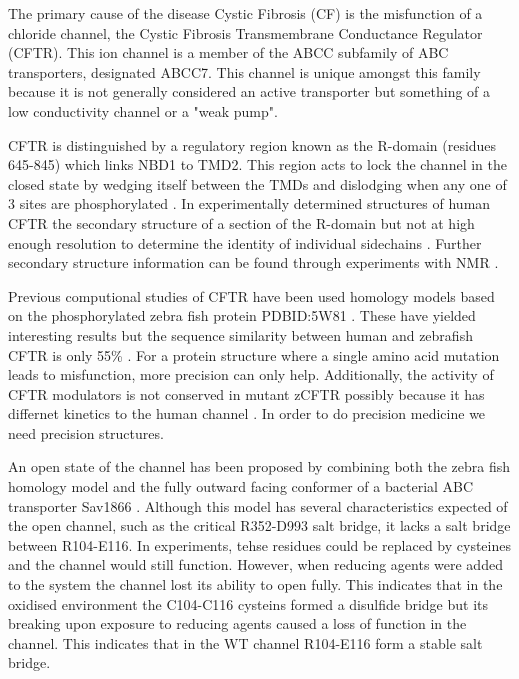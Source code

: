 The primary cause of the disease Cystic Fibrosis (CF) is the misfunction of a chloride channel, the Cystic Fibrosis Transmembrane Conductance Regulator (CFTR). This ion channel is a member of the ABCC subfamily of ABC transporters, designated ABCC7. This channel is unique amongst this family because it is not generally considered an active transporter but something of a low conductivity channel or a "weak pump"\cite{linsdell2018}.

CFTR is distinguished by a regulatory region known as the R-domain (residues 645-845) which links NBD1 to TMD2. This region acts to lock the channel in the closed state by wedging itself between the TMDs and dislodging when any one of 3 sites are phosphorylated \cite{mihalyi2020}. In experimentally determined structures of human CFTR the secondary structure of a section of the R-domain but not at high enough resolution to determine the identity of individual sidechains \cite{zhang2018}\cite{zhang2016}. Further secondary structure information can be found through experiments with NMR \cite{Baker2007}.

Previous computional studies of CFTR have been used homology models based on the phosphorylated zebra fish protein PDBID:5W81 \cite{zhang2017a}. These have yielded interesting results but the sequence similarity between human and zebrafish CFTR is only 55\% \cite{}. For a protein structure where a single amino acid mutation leads to misfunction, more precision can only help. Additionally, the activity of CFTR modulators is not conserved in mutant zCFTR possibly because it has differnet kinetics to the human channel \cite{}. In order to do precision medicine we need precision structures. 

An open state of the channel has been proposed by combining both the zebra fish homology model and the fully outward facing conformer of a bacterial ABC transporter Sav1866 \cite{Hoffmann2018}. Although this model has several characteristics expected of the open channel, such as the critical R352-D993 salt bridge, it lacks a salt bridge between R104-E116. In experiments, tehse residues could be replaced by cysteines and the channel would still function. However, when reducing agents were added to the system the channel lost its ability to open fully. This indicates that in the oxidised environment the C104-C116 cysteins formed a disulfide bridge but its breaking upon exposure to reducing agents caused a loss of function in the channel. This indicates that in the WT channel R104-E116 form a stable salt bridge. 


